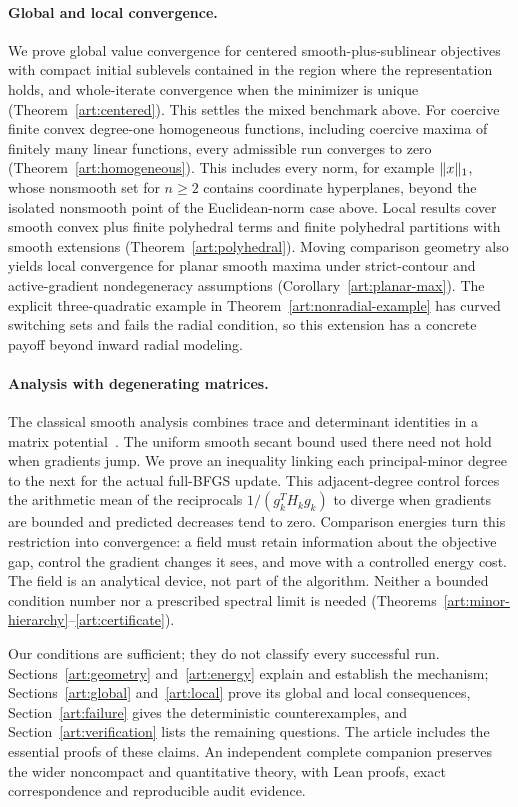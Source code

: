 \paragraph{Global and local convergence.}
We prove global value convergence for centered smooth-plus-sublinear
objectives with compact initial sublevels contained in the region where the
representation holds, and whole-iterate convergence when
the minimizer is unique (Theorem~\ref{art:centered}). This settles the mixed
benchmark above. For coercive finite convex degree-one homogeneous functions,
including coercive maxima of finitely many linear functions, every admissible
run converges to zero (Theorem~\ref{art:homogeneous}). This includes every
norm, for example $\lVert x\rVert_1$, whose nonsmooth set for $n\ge2$ contains
coordinate hyperplanes, beyond the isolated nonsmooth point of the
Euclidean-norm case above. Local results
cover smooth convex plus finite polyhedral terms and finite polyhedral
partitions with smooth extensions (Theorem~\ref{art:polyhedral}). Moving
comparison geometry also yields local convergence for planar smooth maxima
under strict-contour and active-gradient nondegeneracy assumptions
(Corollary~\ref{art:planar-max}). The explicit three-quadratic example in
Theorem~\ref{art:nonradial-example} has curved switching sets and fails the radial
condition, so this extension has a concrete payoff beyond inward radial
modeling.

\paragraph{Analysis with degenerating matrices.}
The classical smooth analysis combines trace and determinant identities in
a matrix potential~\cite[Section~5]{FND_N92}. The uniform smooth secant bound
used there need not hold when gradients jump. We prove an inequality linking
each principal-minor degree to the next for the actual full-BFGS update.
This adjacent-degree control forces the arithmetic mean of the reciprocals
$1/(g_k^TH_kg_k)$ to diverge when gradients are bounded and predicted
decreases tend to zero. Comparison energies turn this restriction into convergence:
a field must retain information about the objective gap, control the gradient
changes it sees, and move with a controlled energy cost. The field is an
analytical device, not part of the algorithm. Neither a bounded condition
number nor a prescribed spectral limit is needed
(Theorems~\ref{art:minor-hierarchy}--\ref{art:certificate}).

Our conditions are sufficient; they do not classify every successful run.
Sections~\ref{art:geometry}
and~\ref{art:energy} explain and establish the mechanism;
Sections~\ref{art:global} and~\ref{art:local} prove its global and local
consequences, Section~\ref{art:failure} gives the deterministic
counterexamples, and Section~\ref{art:verification} lists the remaining questions. The article includes the essential proofs of these claims.
An independent complete companion preserves the wider noncompact and
quantitative theory, with Lean proofs, exact correspondence and reproducible
audit evidence.
